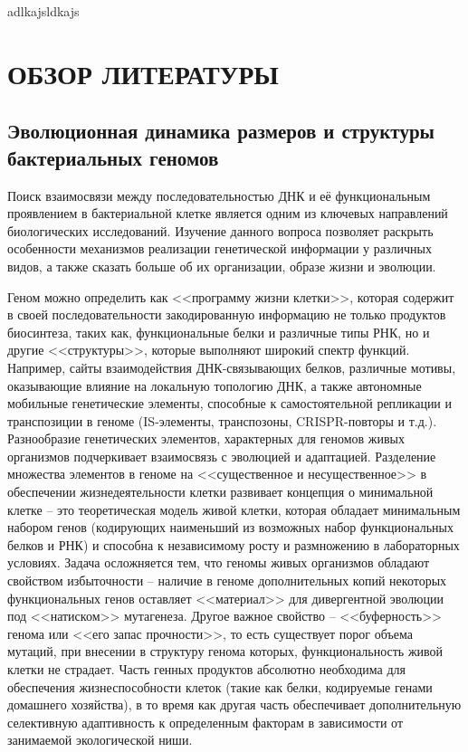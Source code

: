 \documentclass[14pt]{extreport}
\begin{document}
adlkajsldkajs

\chapter{ОБЗОР ЛИТЕРАТУРЫ}

\section{Эволюционная динамика размеров и структуры бактериальных геномов}

Поиск взаимосвязи между последовательностью ДНК и её функциональным проявлением в бактериальной клетке является одним из ключевых направлений биологических исследований. Изучение данного вопроса позволяет раскрыть особенности механизмов реализации генетической информации у различных видов, а также сказать больше об их организации, образе жизни и эволюции.

Геном можно определить как <<программу жизни клетки>>, которая содержит в своей последовательности закодированную информацию не только продуктов биосинтеза, таких как, функциональные белки и различные типы РНК, но и другие <<структуры>>, которые выполняют широкий спектр функций. Например, сайты взаимодействия ДНК-связывающих белков, различные мотивы, оказывающие влияние на локальную топологию ДНК, а также автономные мобильные генетические элементы, способные к самостоятельной репликации и транспозиции в геноме (IS-элементы, транспозоны, CRISPR-повторы и т.д.). Разнообразие генетических элементов, характерных для геномов живых организмов подчеркивает взаимосвязь с эволюцией и адаптацией. Разделение множества элементов в геноме на <<существенное и несущественное>> в обеспечении жизнедеятельности клетки развивает концепция о минимальной клетке -- это теоретическая модель живой клетки, которая обладает минимальным набором генов (кодирующих наименьший из возможных набор функциональных белков и РНК) и способна к независимому росту и размножению в лабораторных условиях. Задача осложняется тем, что геномы живых организмов обладают свойством избыточности -- наличие в геноме дополнительных копий некоторых функциональных генов оставляет <<материал>> для дивергентной эволюции под <<натиском>> мутагенеза. Другое важное свойство -- <<буферность>> генома или <<его запас прочности>>, то есть существует порог объема мутаций, при внесении в структуру генома которых, функциональность живой клетки не страдает. Часть генных продуктов абсолютно необходима для обеспечения жизнеспособности клеток (такие как белки, кодируемые генами домашнего хозяйства), в то время как другая часть обеспечивает дополнительную селективную адаптивность к определенным факторам в зависимости от занимаемой экологической ниши.
\end{document}
